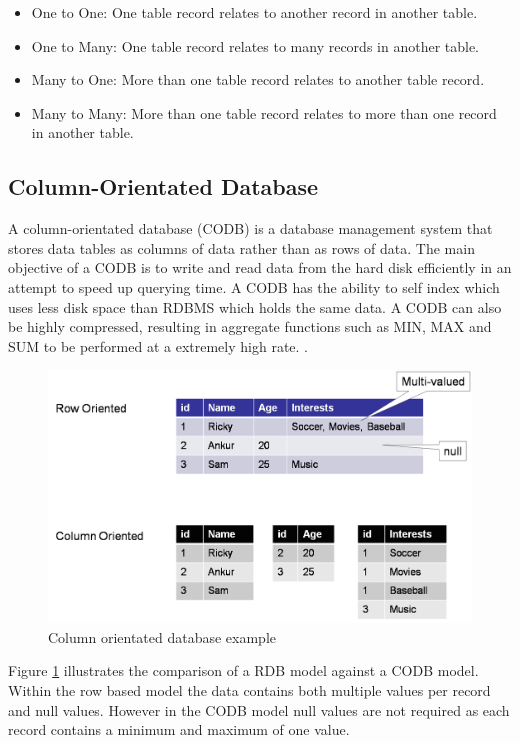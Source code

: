 \begin{itemize}
\item One to One: One table record relates to another record in another table.
\item One to Many: One table record relates to many records in another table.
\item Many to One: More than one table record relates to another table record.
\item Many to Many: More than one table record relates to more than one record in another table.
\end{itemize}


\subsection{Column-Orientated Database}
A column-orientated database (CODB) is a database management system that stores data tables as columns of data rather than as rows of data. The main objective of a CODB is to write and read data from the hard disk efficiently in an attempt to speed up querying time. A CODB has the ability to self index which uses less disk space than RDBMS which holds the same data. A CODB can also be highly compressed, resulting in aggregate functions such as MIN, MAX and SUM to be performed at a extremely high rate. \cite{cd}.

\begin{figure}[h]\begin{center}\includegraphics[width=1\linewidth]{images/codb}\caption{Column orientated database example}\label{fig:cod}\end{center}\end{figure}

Figure \ref{fig:cod} illustrates the comparison of a RDB model against a CODB model. Within the row based model the data contains both multiple values per record and null values. However in the CODB model null values are not required as each record contains a minimum and maximum of one value.

